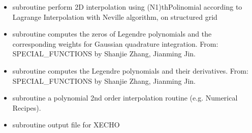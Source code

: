 \documentclass[letterpaper,10pt,english]{sphinxmanual}
\begin{document}
\begin{itemize}
\begin{itemize}
\item {} 
\sphinxAtStartPar
subroutine  \sphinxhyphen{} perform 2D interpolation using (N\sphinxhyphen{}1)th\sphinxhyphen{}Polinomial according to Lagrange Interpolation with Neville algorithm, on structured grid

\item {} 
\sphinxAtStartPar
subroutine  \sphinxhyphen{} computes the zeros of Legendre polynomials and the corresponding
weights for Gaussian quadrature integration. From: SPECIAL\_FUNCTIONS by Shanjie Zhang, Jianming Jin.

\item {} 
\sphinxAtStartPar
subroutine  \sphinxhyphen{} computes the Legendre polynomials and their derivatives. From: SPECIAL\_FUNCTIONS by Shanjie Zhang, Jianming Jin.

\item {} 
\sphinxAtStartPar
subroutine  \sphinxhyphen{} a polynomial 2nd order interpolation routine (e.g. Numerical Recipes).

\item {} 
\sphinxAtStartPar
subroutine  \sphinxhyphen{} output file for X\sphinxhyphen{}ECHO

\end{itemize}

\end{itemize}
\end{document}
